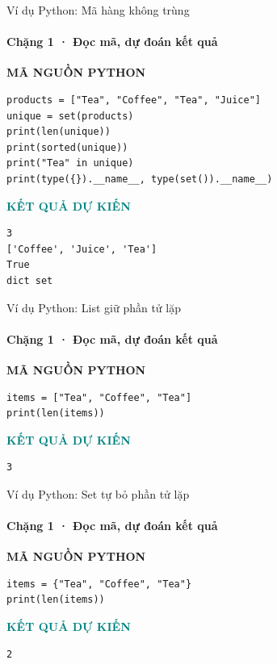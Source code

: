 \documentclass[aspectratio=169,10pt]{beamer}
\begin{document}
\begin{frame}[fragile,t]{Ví dụ Python: Mã hàng không trùng}
\framesubtitle{Chặng 1 · Đọc mã, dự đoán kết quả}
\vspace{-1mm}
{\small\color{muted}\textbf{MÃ NGUỒN PYTHON}}\par\vspace{1mm}
\begin{Verbatim}[fontsize=\scriptsize,frame=single,framesep=4mm,rulecolor=\color{teal!35},breaklines=true]
products = ["Tea", "Coffee", "Tea", "Juice"]
unique = set(products)
print(len(unique))
print(sorted(unique))
print("Tea" in unique)
print(type({}).__name__, type(set()).__name__)
\end{Verbatim}
\vspace{1mm}\textcolor{teal}{\scriptsize\textbf{KẾT QUẢ DỰ KIẾN}}
\begin{Verbatim}[fontsize=\scriptsize,breaklines=true]
3
['Coffee', 'Juice', 'Tea']
True
dict set
\end{Verbatim}

\end{frame}

\begin{frame}[fragile,t]{Ví dụ Python: List giữ phần tử lặp}
\framesubtitle{Chặng 1 · Đọc mã, dự đoán kết quả}
\vspace{-1mm}
{\small\color{muted}\textbf{MÃ NGUỒN PYTHON}}\par\vspace{1mm}
\begin{Verbatim}[fontsize=\scriptsize,frame=single,framesep=4mm,rulecolor=\color{teal!35},breaklines=true]
items = ["Tea", "Coffee", "Tea"]
print(len(items))
\end{Verbatim}
\vspace{1mm}\textcolor{teal}{\scriptsize\textbf{KẾT QUẢ DỰ KIẾN}}
\begin{Verbatim}[fontsize=\scriptsize,breaklines=true]
3
\end{Verbatim}

\end{frame}

\begin{frame}[fragile,t]{Ví dụ Python: Set tự bỏ phần tử lặp}
\framesubtitle{Chặng 1 · Đọc mã, dự đoán kết quả}
\vspace{-1mm}
{\small\color{muted}\textbf{MÃ NGUỒN PYTHON}}\par\vspace{1mm}
\begin{Verbatim}[fontsize=\scriptsize,frame=single,framesep=4mm,rulecolor=\color{teal!35},breaklines=true]
items = {"Tea", "Coffee", "Tea"}
print(len(items))
\end{Verbatim}
\vspace{1mm}\textcolor{teal}{\scriptsize\textbf{KẾT QUẢ DỰ KIẾN}}
\begin{Verbatim}[fontsize=\scriptsize,breaklines=true]
2
\end{Verbatim}

\end{frame}
\end{document}
